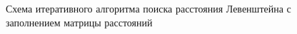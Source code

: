 \begin{figure}[h!]
	
	
	\caption{Схема итеративного алгоритма поиска расстояния Левенштейна с заполнением матрицы расстояний}
	
	\label{fig:l_matrix}
	
\end{figure}

